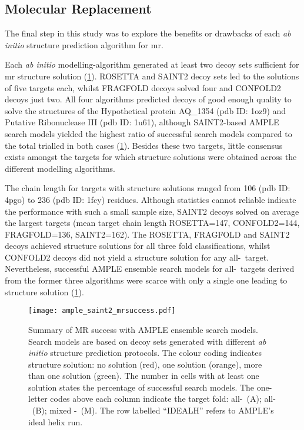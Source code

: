 \subsection{Molecular Replacement}
The final step in this study was to explore the benefits or drawbacks of each \textit{ab initio} structure prediction algorithm for \gls{mr}.

Each \textit{ab initio} modelling-algorithm generated at least two decoy sets sufficient for \gls{mr} structure solution (\cref{fig:ample_saint2_mrsuccess}). ROSETTA and SAINT2 decoy sets led to the solutions of five targets each, whilst FRAGFOLD decoys solved four and CONFOLD2 decoys just two. All four algorithms predicted decoys of good enough quality to solve the structures of the Hypothetical protein AQ\_1354 (\gls{pdb} ID: 1oz9) and Putative Ribonuclease III (\gls{pdb} ID: 1u61), although SAINT2-based AMPLE search models yielded the highest ratio of successful search models compared to the total trialled in both cases (\cref{fig:ample_saint2_mrsuccess}). Besides these two targets, little consensus exists amongst the targets for which structure solutions were obtained across the different modelling algorithms.

The chain length for targets with structure solutions ranged from 106 (\gls{pdb} ID: 4pgo) to 236 (\gls{pdb} ID: 1fcy) residues. Although statistics cannot reliable indicate the performance with such a small sample size, SAINT2 decoys solved on average the largest targets (mean target chain length ROSETTA=147, CONFOLD2=144, FRAGFOLD=136,  SAINT2=162). The ROSETTA, FRAGFOLD and SAINT2 decoys achieved structure solutions for all three fold classifications, whilst CONFOLD2 decoys did not yield a structure solution for any all-\textbeta\ target. Nevertheless, successful AMPLE ensemble search models for all-\textbeta\ targets derived from the former three algorithms were scarce with only a single one leading to structure solution (\cref{fig:ample_saint2_mrsuccess}).

\begin{figure}[H]
    \centering
    \texttt{[image: ample\_saint2\_mrsuccess.pdf]}
    \caption[Summary of MR success with AMPLE ensemble search models]{Summary of MR success with AMPLE ensemble search models. Search models are based on decoy sets generated with different \textit{ab initio} structure prediction protocols. The colour coding indicates structure solution: no solution (red), one solution (orange), more than one solution (green). The number in cells with at least one solution states the percentage of successful search models. The one-letter codes above each column indicate the target fold: all-\textalpha\ (A); all-\textbeta\ (B); mixed \textalpha-\textbeta\ (M). The row labelled ``IDEALH'' refers to AMPLE's ideal helix run.}
    \label{fig:ample_saint2_mrsuccess}
\end{figure}

